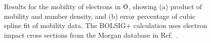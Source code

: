 \documentclass{warpdoc}
\let\citen\cite
\begin{document}
%
\begin{figure}
\centering
{}
\caption{Results for the mobility of electrons in ${\rm O}$, showing (a) product of mobility and number density, and (b) error percentage of cubic spline fit of  mobility data. The BOLSIG+ calculation uses electron impact cross sections from the Morgan database in Ref.\ \citen{jcp:2012:morgan}.}
\label{fig:mobility_O}
\end{figure}
\end{document}
